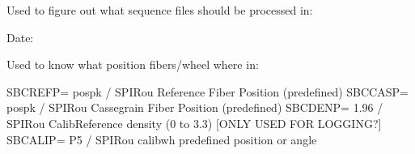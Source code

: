 \documentclass[a4paper,10pt,english]{report}
\begin{document}
Used to figure out what sequence files should be processed in:

\begin{sphinxVerbatim}[commandchars=\\\{\}]
                           
                                
\end{sphinxVerbatim}

Date:

\begin{sphinxVerbatim}[commandchars=\\\{\}]
                     \PYG{p}{[}  \PYG{p}{]}
                  
                 \PYG{p}{[}\PYG{p}{]}   \PYG{p}{[}  \PYG{p}{]}
                 \PYG{p}{[}\PYG{p}{]}   \PYG{p}{[}  \PYG{p}{]}
\end{sphinxVerbatim}

Used to know what position fibers/wheel where in:

\begin{sphinxVerbatim}[commandchars=\\\{\}]
SBCREF\PYGZus{}P= \PYGZsq{}pos\PYGZus{}pk  \PYGZsq{}           / SPIRou Reference Fiber Position (predefined)
SBCCAS\PYGZus{}P= \PYGZsq{}pos\PYGZus{}pk  \PYGZsq{}           / SPIRou Cassegrain Fiber Position (predefined)
SBCDEN\PYGZus{}P=                 1.96 / SPIRou Calib\PYGZhy{}Reference density (0 to 3.3)  [ONLY USED FOR LOGGING?]
SBCALI\PYGZus{}P= \PYGZsq{}P5      \PYGZsq{}           / SPIRou calibwh predefined position or angle
\end{sphinxVerbatim}
\end{document}
